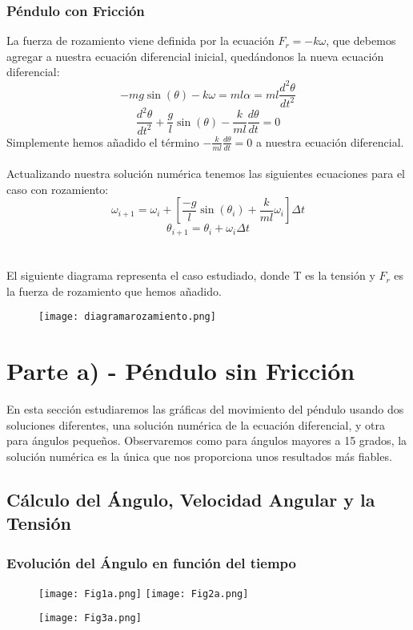 \documentclass{article}
\begin{document}
\subsubsection{Péndulo con Fricción}
La fuerza de rozamiento viene definida por la ecuación $F_{r} = -k \omega$, que debemos agregar a nuestra ecuación diferencial inicial, quedándonos la nueva ecuación diferencial: \[ -m g \sin(\theta) - k \omega = m l \alpha = m l \frac{d^2\theta}{dt^2} \] \[\boxed{\frac{d^{2}\theta}{dt^{2}} + \frac{g}{l} \sin(\theta) - \frac{k}{m l} \frac{d\theta}{dt} = 0}\]
Simplemente hemos añadido el término $- \frac{k}{m l} \frac{d\theta}{dt} = 0$ a nuestra ecuación diferencial.\\ \\
Actualizando nuestra solución numérica tenemos las siguientes ecuaciones para el caso con rozamiento:
\[ \boxed{\omega_{i+1} = \omega_{i} + \left[ \frac{-g}{l} \sin(\theta_{i}) + \frac{k}{m l}\omega_{i} \right] \Delta t}\]
\[ \boxed{\theta_{i+1} = \theta_{i} + \omega_{i} \Delta t}\]
\\ \\
El siguiente diagrama representa el caso estudiado, donde T es la tensión y $F_{r}$ es la fuerza de rozamiento que hemos añadido.

\begin{figure}[h]
\centering
\texttt{[image: diagramarozamiento.png]}
\end{figure}
\section{Parte a) - Péndulo sin Fricción}
En esta sección estudiaremos las gráficas del movimiento del péndulo usando dos soluciones diferentes, una solución numérica de la ecuación diferencial, y otra para ángulos pequeños. Observaremos como para ángulos mayores a 15 grados, la solución numérica es la única que nos proporciona unos resultados más fiables.

\subsection{Cálculo del Ángulo, Velocidad Angular y la Tensión}
\subsubsection{Evolución del Ángulo en función del tiempo}
\begin{figure}[h]
\centering
\hspace*{-2.3cm}
\texttt{[image: Fig1a.png]}\hfill
\texttt{[image: Fig2a.png]}
\hspace*{-2.3cm}
\end{figure}
\begin{figure}[h]
\centering
\texttt{[image: Fig3a.png]}
\end{figure}
\end{document}
